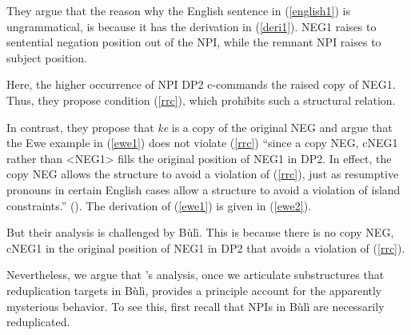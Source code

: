 \documentclass[output=paper,colorlinks,citecolor=brown]{langscibook}
\begin{document}
They argue that the reason why the English sentence in (\ref{english1}) is ungrammatical, is because it has the derivation in (\ref{deri1}). NEG1 raises to sentential negation position out of the NPI, while the remnant NPI raises to subject position.

\z

Here, the higher occurrence of  NPI DP2 c-commands the raised copy of NEG1. Thus, they propose condition (\ref{rrc}), which prohibits such a structural relation.

\z

In contrast, they propose that \textit{ke} is a copy of the original NEG and argue that the Ewe example in (\ref{ewe1}) does not violate (\ref{rrc}) ``since a copy NEG, cNEG1 rather than <NEG1> fills the original position of NEG1 in DP2. In effect, the copy NEG allows the structure to avoid a violation of (\ref{rrc}), just as resumptive pronouns in certain English cases allow a structure to avoid a violation of island constraints.'' (\citealt{CollinsEtAl2017}). The derivation of (\ref{ewe1}) is given in (\ref{ewe2}).

\z



But their analysis is challenged by Bùlì. This is because there is no copy NEG, cNEG1 in the original position of NEG1 in DP2 that avoids a violation of (\ref{rrc}).


\z

Nevertheless, we argue that \citeauthor{CollinsEtAl2017}'s analysis, once we articulate substructures that reduplication targets in Bùlì, provides a principle account for the apparently mysterious behavior. To see this, first recall that NPIs in Bùlì are necessarily reduplicated.
\end{document}
